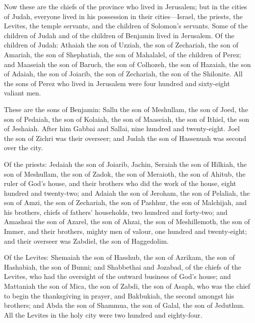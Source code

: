  Now these are the chiefs of the province who lived in
Jerusalem; but in the cities of Judah, everyone lived in his possession
in their cities---Israel, the priests, the Levites, the temple servants,
and the children of Solomon's servants.  Some of the
children of Judah and of the children of Benjamin lived in Jerusalem. Of
the children of Judah: Athaiah the son of Uzziah, the son of Zechariah,
the son of Amariah, the son of Shephatiah, the son of Mahalalel, of the
children of Perez;  and Maaseiah the son of Baruch, the
son of Colhozeh, the son of Hazaiah, the son of Adaiah, the son of
Joiarib, the son of Zechariah, the son of the Shilonite. 
All the sons of Perez who lived in Jerusalem were four hundred and
sixty-eight valiant men.

 These are the sons of Benjamin: Sallu the son of
Meshullam, the son of Joed, the son of Pedaiah, the son of Kolaiah, the
son of Maaseiah, the son of Ithiel, the son of Jeshaiah. 
After him Gabbai and Sallai, nine hundred and twenty-eight.
 Joel the son of Zichri was their overseer; and Judah the
son of Hassenuah was second over the city.

 Of the priests: Jedaiah the son of Joiarib, Jachin,
 Seraiah the son of Hilkiah, the son of Meshullam, the
son of Zadok, the son of Meraioth, the son of Ahitub, the ruler of God's
house,  and their brothers who did the work of the house,
eight hundred and twenty-two; and Adaiah the son of Jeroham, the son of
Pelaliah, the son of Amzi, the son of Zechariah, the son of Pashhur, the
son of Malchijah,  and his brothers, chiefs of fathers'
households, two hundred and forty-two; and Amashsai the son of Azarel,
the son of Ahzai, the son of Meshillemoth, the son of Immer,
 and their brothers, mighty men of valour, one hundred
and twenty-eight; and their overseer was Zabdiel, the son of Haggedolim.

 Of the Levites: Shemaiah the son of Hasshub, the son of
Azrikam, the son of Hashabiah, the son of Bunni;  and
Shabbethai and Jozabad, of the chiefs of the Levites, who had the
oversight of the outward business of God's house;  and
Mattaniah the son of Mica, the son of Zabdi, the son of Asaph, who was
the chief to begin the thanksgiving in prayer, and Bakbukiah, the second
amongst his brothers; and Abda the son of Shammua, the son of Galal, the
son of Jeduthun.  All the Levites in the holy city were
two hundred and eighty-four.

